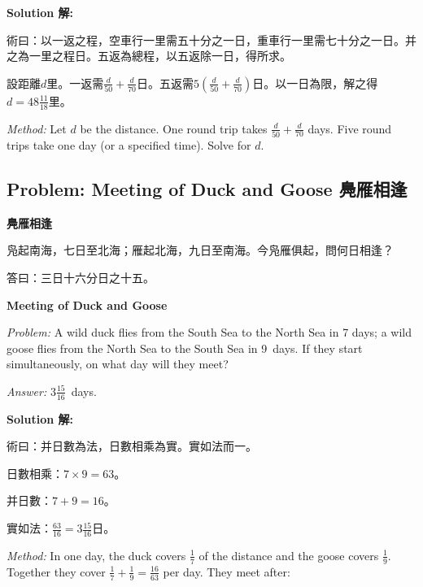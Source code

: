 \documentclass[11pt,a4paper]{article}
\newcommand{\zh}[1]{{\CJKfamily{\CJKrmdefault} #1}}
\newenvironment{chside}{%
  \begin{minipage}[t]{0.48\textwidth}%
  \setlength{\parindent}{1.5em}%
  \linespread{1.25}\selectfont%
  \small%
}{%
  \end{minipage}%
}
\newenvironment{enside}{%
  \hfill\begin{minipage}[t]{0.48\textwidth}%
  \setlength{\parindent}{1em}%
  \linespread{1.15}\selectfont%
  \small%
}{%
  \end{minipage}%
}
\newenvironment{solution}{%
  \par\medskip\noindent\textbf{\textcolor{notecolor}{Solution \zh{解}:}}\par\nopagebreak
  \small\setlength{\parindent}{1em}%
}{%
  \par\medskip%
}
\begin{document}
\begin{solution}
\noindent\begin{chside}
\zh{術曰：以一返之程，空車行一里需五十分之一日，重車行一里需七十分之一日。并之為一里之程日。五返為總程，以五返除一日，得所求。}

設距離$d$里。一返需$\frac{d}{50} + \frac{d}{70}$日。五返需$5(\frac{d}{50} + \frac{d}{70})$日。以一日為限，解之得$d = 48\frac{11}{18}$里。
\end{chside}%
\begin{enside}
\textit{Method:} Let $d$ be the distance. One round trip takes
$\frac{d}{50} + \frac{d}{70}$ days. Five round trips take one day (or a
specified time). Solve for $d$.
\end{enside}
\end{solution}

\subsection{Problem: Meeting of Duck and Goose \zh{鳧雁相逢}}

\noindent\begin{chside}
\noindent\textbf{鳧雁相逢}

\zh{凫起南海，七日至北海；雁起北海，九日至南海。今凫雁俱起，問何日相逢？}

\medskip
\zh{答曰：三日十六分日之十五。}
\end{chside}%
\begin{enside}
\noindent\textbf{Meeting of Duck and Goose}

\textit{Problem:} A wild duck flies from the South Sea to the North Sea in 7
days; a wild goose flies from the North Sea to the South Sea in 9~days. If
they start simultaneously, on what day will they meet?

\medskip
\textit{Answer:} $3\frac{15}{16}$~days.
\end{enside}

\begin{solution}
\noindent\begin{chside}
\zh{術曰：并日數為法，日數相乘為實。實如法而一。}

日數相乘：$7 \times 9 = 63$。

并日數：$7 + 9 = 16$。

實如法：$\frac{63}{16} = 3\frac{15}{16}$日。
\end{chside}%
\begin{enside}
\textit{Method:} In one day, the duck covers $\frac{1}{7}$ of the distance
and the goose covers $\frac{1}{9}$. Together they cover
$\frac{1}{7} + \frac{1}{9} = \frac{16}{63}$ per day. They meet after:
\end{enside}
\end{solution}
\end{document}
